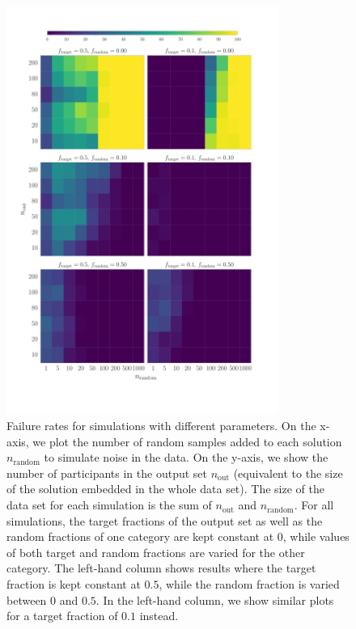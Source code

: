 \documentclass[10pt,letterpaper]{article}
\begin{document}
\begin{figure}[htbp]
\begin{center}
\includegraphics[width=3.5in]{f1.pdf}
\caption{Failure rates for simulations with different parameters. On the x-axis, we plot the number of random samples added to each solution $n_\mathrm{random}$ to simulate noise in the data. On the y-axis, we show the number of participants in the output set $n_\mathrm{out}$ (equivalent to the size of the solution embedded in the whole data set). The size of the data set for each simulation is the sum of $n_\mathrm{out}$ and $n_\mathrm{random}$. For all simulations, the target fractions of the output set as well as the random fractions of one category are kept constant at $0$, while values of both target and random fractions are varied for the other category. The left-hand column shows results where the target fraction is kept constant at $0.5$, while the random fraction is varied between $0$ and $0.5$. In the left-hand column, we show similar plots for a target fraction of $0.1$ instead.} 
\label{fig:experiments1}
\end{center}
\end{figure}
\end{document}
